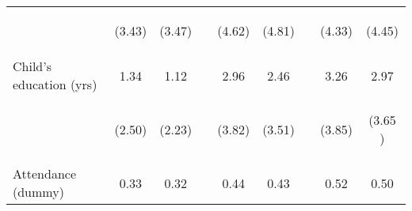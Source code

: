 \documentclass{article}[11pt,subeqn]
\begin{document}
\begin{spacing}{1.5}
\begin{table}[ht]
\begin{center}
\begin{tabular}{lccp{5mm}ccp{5mm}cc}
\begin{footnotesize}\end{footnotesize}	& \begin{footnotesize} (3.43)\end{footnotesize} & \begin{footnotesize} (3.47)\end{footnotesize} & \begin{footnotesize} 	\end{footnotesize} & \begin{footnotesize} (4.62)\end{footnotesize} & \begin{footnotesize} (4.81)\end{footnotesize} & \begin{footnotesize} 	\end{footnotesize} & \begin{footnotesize} (4.33)\end{footnotesize} & \begin{footnotesize} (4.45)\end{footnotesize}	\\
Child's education (yrs)	&	1.34	&	1.12	&	&	2.96	&	2.46	&	&	3.26	&	2.97		\\
\begin{footnotesize}\end{footnotesize}	& \begin{footnotesize} (2.50)\end{footnotesize} & \begin{footnotesize} (2.23)\end{footnotesize} & \begin{footnotesize} 	\end{footnotesize} & \begin{footnotesize} (3.82)\end{footnotesize} & \begin{footnotesize} (3.51)\end{footnotesize} & \begin{footnotesize} 	\end{footnotesize} & \begin{footnotesize} (3.85)\end{footnotesize} & \begin{footnotesize} (3.65	)\end{footnotesize}	\\
Attendance (dummy)	&	0.33	&	0.32	&	&	0.44	&	0.43	&	&	0.52	&	0.50		\\

\end{tabular}
\end{center}
\end{table}
\end{spacing}
\end{document}
